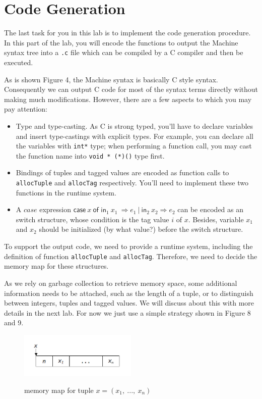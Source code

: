 \documentclass{article}
\theoremstyle{definition}
\theoremstyle{remark}
\numberwithin{equation}{section}
\begin{document}
\section{Code Generation}

The last task for you in this lab is to implement the code generation procedure.
In this part of the lab, you will encode the functions to output the
Machine syntax tree into a \texttt{.c} file which can be compiled by
a C compiler and then be executed.

As is shown Figure 4, the Machine syntax is basically C style syntax.
Consequently we can output C code for most of the syntax terms directly without making
much modifications. However, there are a few aspects to which you may pay attention:

\begin{itemize}
  \item Type and type-casting. As C is strong typed, you'll have to declare
  variables and insert type-castings with explicit types. For example, you can
  declare all the variables with \texttt{int*} type; when performing a
  function call, you may cast the function name into \texttt{void * (*)()} type first.
  \item Bindings of tuples and tagged values are encoded as function calls to
  \texttt{allocTuple} and \texttt{allocTag} respectively. You'll need to implement
  these two functions in the runtime system.
  \item A $case$ expression $\textsf{case}\ x\ \textsf{of in}_1\ x_1\ \Rightarrow e_1
                    \ |\ \textsf{in}_2\ x_2 \Rightarrow e_2$ can be encoded as an
  switch structure, whose condition is the tag value $i$ of $x$. Besides, variable
  $x_1$ and $x_2$ should be initialized (by what value?) before the switch structure.
\end{itemize}

To support the output code, we need to provide a runtime system, including the definition
 of function \texttt{allocTuple} and \texttt{allocTag}. Therefore, we need to decide
the memory map for these structures.

As we rely on garbage
collection to retrieve memory space, some additional information needs to be attached,
 such as the length of a tuple, or to distinguish between integers, tuples and tagged
 values. We will discuss about this with more details in
the next lab. For now we just use a simple strategy shown in Figure 8 and 9.

\begin{figure}
  \centering
  \includegraphics[width=0.5\textwidth]{tuple.png}\\
  \caption{memory map for tuple $x=(x_1,\ ...,\ x_n)$}\label{fig:digit}
\end{figure}
\end{document}
